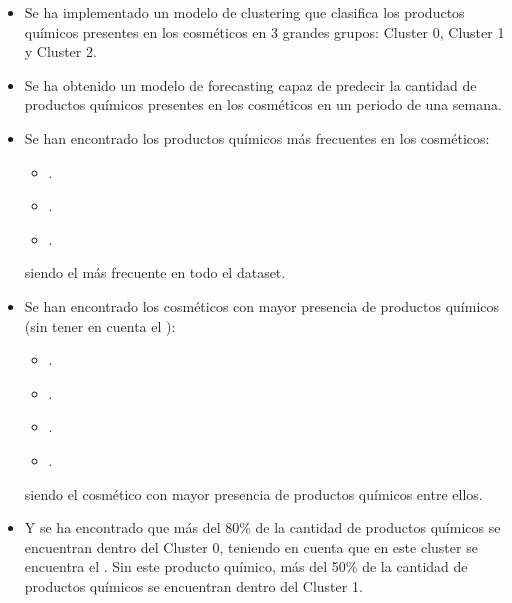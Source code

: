 \begin{itemize}
 \item Se ha implementado un modelo de clustering que clasifica los productos químicos presentes en los cosméticos en 3 grandes grupos: Cluster 0, Cluster 1 y Cluster 2.
 
 \item Se ha obtenido un modelo de forecasting capaz de predecir la cantidad de productos químicos presentes en los cosméticos en un periodo de una semana.
 
 \item Se han encontrado los productos químicos más frecuentes en los cosméticos:
\begin{itemize}
  \item {}.
  \item {}.
  \item {}.
 \end{itemize}

 siendo  el más frecuente en todo el dataset.
 
 \item Se han encontrado los cosméticos con mayor presencia de productos químicos (sin tener en cuenta el ):
 \begin{itemize}
  \item {}.
  \item {}.
  \item {}.
  \item {}.
 \end{itemize}
 
 siendo  el cosmético con mayor presencia de productos químicos entre ellos.
 
 \item Y se ha encontrado que más del 80\% de la cantidad de productos químicos se encuentran dentro del Cluster 0, teniendo en cuenta que en este cluster se encuentra el . Sin este producto químico, más del 50\% de la cantidad de productos químicos se encuentran dentro del Cluster 1. 
\end{itemize}




